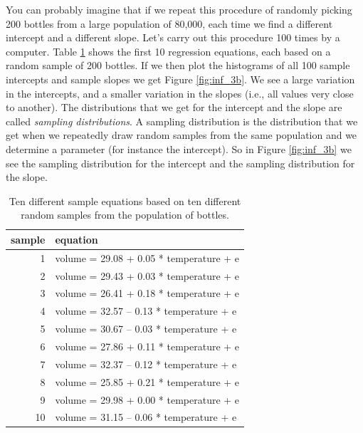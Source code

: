 \documentclass[]{report}\usepackage[]{graphicx}\usepackage[]{color}
\begin{document}
You can probably imagine that if we repeat this procedure of randomly picking 200 bottles from a large population of 80,000, each time we find a different intercept and a different slope. Let's carry out this procedure 100 times by a computer. Table \ref{tab:inf_3a} shows the first 10 regression equations, each based on a random sample of 200 bottles. If we then plot the histograms of all 100 sample intercepts and sample slopes we get Figure \ref{fig:inf_3b}. We see a large variation in the intercepts, and a smaller variation in the slopes (i.e., all values very close to another). The distributions that we get for the intercept and the slope are called \textit{sampling distributions}. A sampling distribution is the distribution that we get when we repeatedly draw random samples from the same population and we determine a parameter (for instance the intercept). So in Figure \ref{fig:inf_3b} we see the sampling distribution for the intercept and the sampling distribution for the slope. 




\begin{table}[ht]
\centering
\caption{Ten different sample equations based on ten different random samples from the population of bottles.} 
\label{tab:inf_3a}
\begin{tabular}{rl}
  \hline
sample & equation \\ 
  \hline
1 & volume =  29.08  +  0.05 * temperature + e \\ 
  2 & volume =  29.43  +  0.03 * temperature + e \\ 
  3 & volume =  26.41  +  0.18 * temperature + e \\ 
  4 & volume =  32.57  --  0.13 * temperature + e \\ 
  5 & volume =  30.67  --  0.03 * temperature + e \\ 
  6 & volume =  27.86  +  0.11 * temperature + e \\ 
  7 & volume =  32.37  --  0.12 * temperature + e \\ 
  8 & volume =  25.85  +  0.21 * temperature + e \\ 
  9 & volume =  29.98  +  0.00 * temperature + e \\ 
  10 & volume =  31.15  --  0.06 * temperature + e \\ 
   \hline
\end{tabular}
\end{table}
\end{document}

